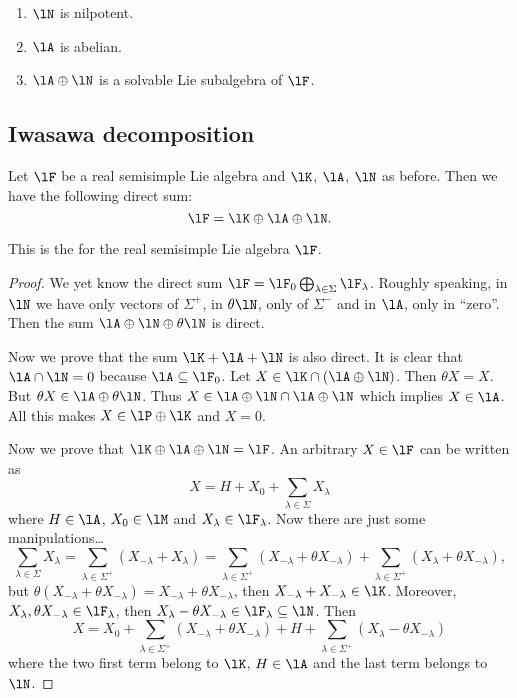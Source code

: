 \begin{enumerate}
	\item $\lN$ is nilpotent.
	\item $\lA$ is abelian.
	\item $\lA\oplus\lN$ is a solvable Lie subalgebra of $\lF$.
\end{enumerate}

\subsection{Iwasawa decomposition}

\begin{theorem}
	Let $\lF$ be a real semisimple Lie algebra and $\lK$, $\lA$, $\lN$ as before. Then we have the following direct sum:
	\begin{equation}
		\lF=\lK\oplus\lA\oplus\lN.
	\end{equation}
\end{theorem}

This is the  for the real semisimple Lie algebra $\lF$.

\begin{proof}
	We yet know the direct sum $\lF=\lF_0\bigoplus_{\lambda\in\Sigma}\lF_{\lambda}$. Roughly speaking, in $\lN$ we have only vectors of $\Sigma^+$, in $\theta\lN$, only of $\Sigma^-$ and in $\lA$, only in ``zero''. Then the sum $\lA\oplus\lN\oplus\theta\lN$ is direct.

	Now we prove that the sum $\lK+\lA+\lN$ is also direct. It is clear that $\lA\cap\lN=0$ because $\lA\subseteq\lF_0$. Let $X\in\lK\cap(\lA\oplus\lN)$. Then $\theta X=X$. But $\theta X\in\lA\oplus\theta\lN$. Thus $X\in\lA\oplus\lN\cap\lA\oplus\lN$ which implies $X\in\lA$. All this makes $X\in\lP\oplus\lK$ and $X=0$.

	Now we prove that $\lK\oplus\lA\oplus\lN=\lF$. An arbitrary $X\in\lF$ can be written as
	\[
		X=H+X_0+\sum_{\lambda\in\Sigma}X_{\lambda}
	\]
	where $H\in\lA$, $X_0\in\lM$ and $X_{\lambda}\in\lF_{\lambda}$. Now there are just some manipulations\ldots
	\begin{equation}
		\sum_{\lambda\in\Sigma}X_{\lambda}=\sum_{\lambda\in\Sigma^+}(X_{-\lambda}+X_{\lambda})
		=\sum_{\lambda\in\Sigma^+}(X_{-\lambda}+\theta X_{-\lambda})
		+\sum_{\lambda\in\Sigma^+}(X_{\lambda}+\theta X_{-\lambda}),
	\end{equation}
	but $\theta(X_{-\lambda}+\theta X_{-\lambda})=X_{-\lambda}+\theta X_{-\lambda}$, then $X_{-\lambda}+X_{-\lambda}\in\lK$. Moreover, $X_{\lambda}, \theta X_{-\lambda}\in\lF_{\lambda}$, then $X_{\lambda}-\theta X_{-\lambda}\in\lF_{\lambda}\subseteq\lN$. Then
	\begin{equation}
		X=X_0+\sum_{\lambda\in\Sigma^+}(X_{-\lambda}+\theta X_{-\lambda})+H+\sum_{\lambda\in\Sigma^+}(X_{\lambda}-\theta X_{-\lambda})
	\end{equation}
	where the two first term belong to $\lK$, $H\in\lA$ and the last term belongs to $\lN$.
\end{proof}

